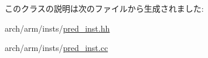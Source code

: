 このクラスの説明は次のファイルから生成されました:\begin{DoxyCompactItemize}
\item 
arch/arm/insts/\hyperlink{pred__inst_8hh}{pred\_\-inst.hh}\item 
arch/arm/insts/\hyperlink{pred__inst_8cc}{pred\_\-inst.cc}\end{DoxyCompactItemize}
